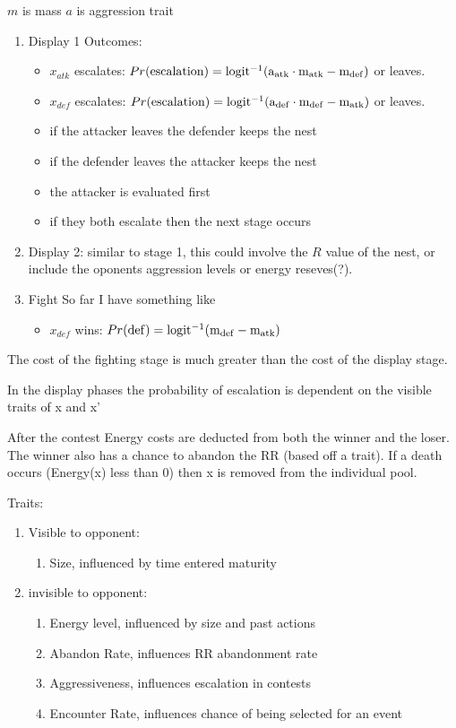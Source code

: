 \documentclass[a4paper,11pt]{article}
\begin{document}
$m$ is mass
$a$ is aggression trait
\begin{enumerate}
    \item Display 1
        Outcomes:
        \begin{itemize}
            \item $x_{atk}$ escalates: 
                $Pr(\rm{escalation}) =  logit^{-1}(a_{atk} \cdot m_{atk} - m_{def})$
                or leaves.
            \item $x_{def}$ escalates:
                $Pr(\rm{escalation}) =  logit^{-1}(a_{def} \cdot m_{def} - m_{atk})$ 
                or leaves.
            \item if the attacker leaves the defender keeps the nest
            \item if the defender leaves the attacker keeps the nest
            \item the attacker is evaluated first
            \item if they both escalate then the next stage occurs
        \end{itemize}
    \item Display 2:
        similar to stage 1, this could involve the $R$ value of the nest, or include the oponents aggression levels or energy reseves(?).
    \item Fight
        So far I have something like
        \begin{itemize}
            \item $x_{def}$ wins:
            $Pr(\rm{def}) = logit^{-1}(m_{def} - m_{atk})$
        \end{itemize}
\end{enumerate}
The cost of the fighting stage is much greater than the cost of the display stage.

In the display phases the probability of escalation is dependent on the visible traits of x and x'

After the contest Energy costs are deducted from both the winner and the loser.
The winner also has a chance to abandon the RR (based off a trait).
If a death occurs (Energy(x) less than 0) then x is removed from the individual pool.

Traits:
\begin{enumerate}
    \item Visible to opponent:
    \begin{enumerate}
        \item Size, influenced by time entered maturity
    \end{enumerate}
    \item invisible to opponent:
    \begin{enumerate}
        \item Energy level, influenced by size and past actions
        \item Abandon Rate, influences RR abandonment rate
        \item Aggressiveness, influences escalation in contests
        \item Encounter Rate, influences chance of being selected for an event
    \end{enumerate}
\end{enumerate}
\clearpage
\end{document}
